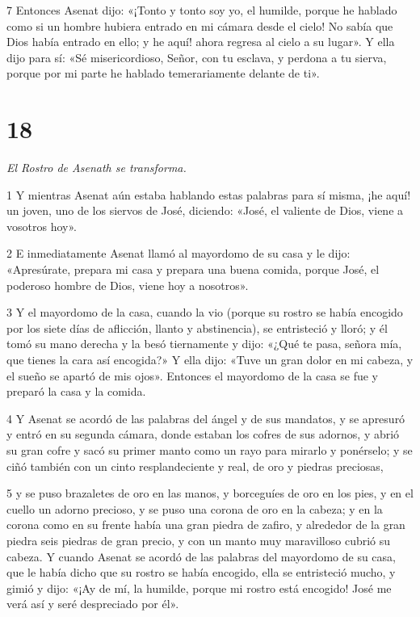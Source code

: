 \par 7 Entonces Asenat dijo: «¡Tonto y tonto soy yo, el humilde, porque he hablado como si un hombre hubiera entrado en mi cámara desde el cielo! No sabía que Dios había entrado en ello; y he aquí! ahora regresa al cielo a su lugar». Y ella dijo para sí: «Sé misericordioso, Señor, con tu esclava, y perdona a tu sierva, porque por mi parte he hablado temerariamente delante de ti».

\chapter{18}

\par \textit{El Rostro de Asenath se transforma.}

\par 1 Y mientras Asenat aún estaba hablando estas palabras para sí misma, ¡he aquí! un joven, uno de los siervos de José, diciendo: «José, el valiente de Dios, viene a vosotros hoy».

\par 2 E inmediatamente Asenat llamó al mayordomo de su casa y le dijo: «Apresúrate, prepara mi casa y prepara una buena comida, porque José, el poderoso hombre de Dios, viene hoy a nosotros».

\par 3 Y el mayordomo de la casa, cuando la vio (porque su rostro se había encogido por los siete días de aflicción, llanto y abstinencia), se entristeció y lloró; y él tomó su mano derecha y la besó tiernamente y dijo: «¿Qué te pasa, señora mía, que tienes la cara así encogida?» Y ella dijo: «Tuve un gran dolor en mi cabeza, y el sueño se apartó de mis ojos». Entonces el mayordomo de la casa se fue y preparó la casa y la comida.

\par 4 Y Asenat se acordó de las palabras del ángel y de sus mandatos, y se apresuró y entró en su segunda cámara, donde estaban los cofres de sus adornos, y abrió su gran cofre y sacó su primer manto como un rayo para mirarlo y ponérselo; y se ciñó también con un cinto resplandeciente y real, de oro y piedras preciosas,

\par 5 y se puso brazaletes de oro en las manos, y borceguíes de oro en los pies, y en el cuello un adorno precioso, y se puso una corona de oro en la cabeza; y en la corona como en su frente había una gran piedra de zafiro, y alrededor de la gran piedra seis piedras de gran precio, y con un manto muy maravilloso cubrió su cabeza. Y cuando Asenat se acordó de las palabras del mayordomo de su casa, que le había dicho que su rostro se había encogido, ella se entristeció mucho, y gimió y dijo: «¡Ay de mí, la humilde, porque mi rostro está encogido! José me verá así y seré despreciado por él».

